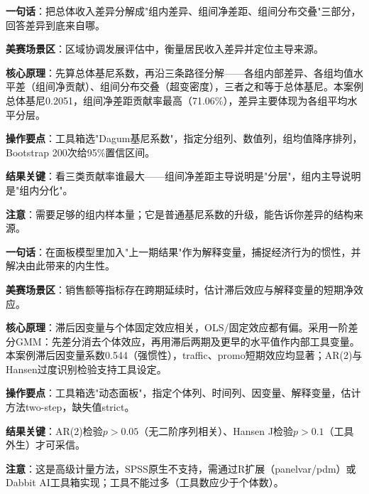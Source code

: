 \begin{algobrief}
\textbf{一句话}：把总体收入差异分解成"组内差异、组间净差距、组间分布交叠"三部分，回答差异到底来自哪。

\textbf{美赛场景区}：区域协调发展评估中，衡量居民收入差异并定位主导来源。

\textbf{核心原理}：先算总体基尼系数，再沿三条路径分解——各组内部差异、各组均值水平差（组间净贡献）、组间分布交叠（超变密度），三者之和等于总体基尼。本案例总体基尼0.2051，组间净差距贡献率最高（71.06\%），差异主要体现为各组平均水平分层。

\textbf{操作要点}：工具箱选"Dagum基尼系数"，指定分组列、数值列，组均值降序排列，Bootstrap 200次给95\%置信区间。

\textbf{结果关键}：看三类贡献率谁最大——组间净差距主导说明是"分层"，组内主导说明是"组内分化"。

\textbf{注意}：需要足够的组内样本量；它是普通基尼系数的升级，能告诉你差异的结构来源。
\end{algobrief}


\begin{algobrief}
\textbf{一句话}：在面板模型里加入"上一期结果"作为解释变量，捕捉经济行为的惯性，并解决由此带来的内生性。

\textbf{美赛场景区}：销售额等指标存在跨期延续时，估计滞后效应与解释变量的短期净效应。

\textbf{核心原理}：滞后因变量与个体固定效应相关，OLS/固定效应都有偏。采用一阶差分GMM：先差分消去个体效应，再用滞后两期及更早的水平值作内部工具变量。本案例滞后因变量系数0.544（强惯性），traffic、promo短期效应均显著；AR(2)与Hansen过度识别检验支持工具设定。

\textbf{操作要点}：工具箱选"动态面板"，指定个体列、时间列、因变量、解释变量，估计方法two-step，缺失值strict。

\textbf{结果关键}：AR(2)检验$p>0.05$（无二阶序列相关）、Hansen J检验$p>0.1$（工具外生）才可采信。

\textbf{注意}：这是高级计量方法，SPSS原生不支持，需通过R扩展（panelvar/pdm）或Dabbit AI工具箱实现；工具不能过多（工具数应少于个体数）。
\end{algobrief}


